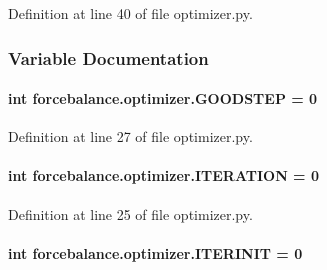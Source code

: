 Definition at line 40 of file optimizer.\-py.



\subsubsection{Variable Documentation}
\hypertarget{namespaceforcebalance_1_1optimizer_a7b0cf561a0ec911ee4b217cb0b05a28e}{
\paragraph[{G\-O\-O\-D\-S\-T\-E\-P}]{\setlength{\rightskip}{0pt plus 5cm}int forcebalance.\-optimizer.\-G\-O\-O\-D\-S\-T\-E\-P = 0}}\label{namespaceforcebalance_1_1optimizer_a7b0cf561a0ec911ee4b217cb0b05a28e}


Definition at line 27 of file optimizer.\-py.

\hypertarget{namespaceforcebalance_1_1optimizer_aaf93ec60981b2c73b2f36a4cf5c5874f}{
\paragraph[{I\-T\-E\-R\-A\-T\-I\-O\-N}]{\setlength{\rightskip}{0pt plus 5cm}int forcebalance.\-optimizer.\-I\-T\-E\-R\-A\-T\-I\-O\-N = 0}}\label{namespaceforcebalance_1_1optimizer_aaf93ec60981b2c73b2f36a4cf5c5874f}


Definition at line 25 of file optimizer.\-py.

\hypertarget{namespaceforcebalance_1_1optimizer_a42aec8ce55b20c7ffdd69bf188ebbf44}{
\paragraph[{I\-T\-E\-R\-I\-N\-I\-T}]{\setlength{\rightskip}{0pt plus 5cm}int forcebalance.\-optimizer.\-I\-T\-E\-R\-I\-N\-I\-T = 0}}\label{namespaceforcebalance_1_1optimizer_a42aec8ce55b20c7ffdd69bf188ebbf44}


